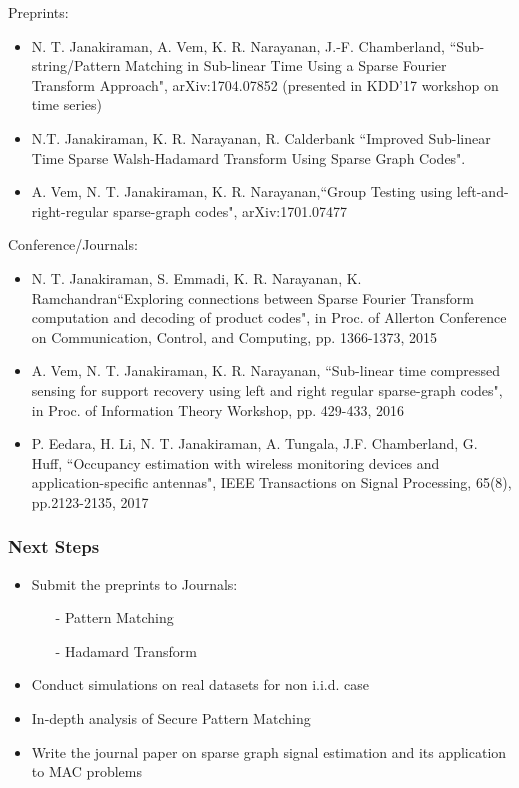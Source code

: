 \documentclass[10pt,xcolor=table]{beamer}
\begin{document}
\begin{frame}%
Preprints:
{\footnotesize 
	\begin{itemize}
		\item N. T. Janakiraman, A. Vem, K. R. Narayanan, J.-F. Chamberland, {\blue``Sub-string/Pattern Matching in Sub-linear Time Using a Sparse Fourier Transform Approach",} arXiv:1704.07852 (presented in KDD'17 workshop on time series)
		\item N.T. Janakiraman, K. R. Narayanan, R. Calderbank {\blue``Improved Sub-linear Time Sparse Walsh-Hadamard Transform Using Sparse Graph Codes"}.
		\item A. Vem, N. T. Janakiraman, K. R. Narayanan,{\blue ``Group Testing using left-and-right-regular sparse-graph codes",} arXiv:1701.07477
		
	\end{itemize}
}

Conference/Journals:
{\footnotesize 
	\begin{itemize}
		\item N. T. Janakiraman, S. Emmadi, K. R. Narayanan, K. Ramchandran{\blue ``Exploring connections between Sparse Fourier Transform computation and decoding of product codes",} in Proc. of Allerton Conference on Communication, Control, and Computing, pp. 1366-1373, 2015
		\item A. Vem, N. T. Janakiraman, K. R. Narayanan, {\blue ``Sub-linear time compressed sensing for support recovery using left and right regular sparse-graph codes",} in Proc. of Information Theory Workshop, pp. 429-433, 2016
		\item P. Eedara, H. Li, N. T. Janakiraman, A. Tungala, J.F. Chamberland, G. Huff, {\blue ``Occupancy estimation with wireless monitoring devices and application-specific antennas",} IEEE Transactions on Signal Processing, 65(8), pp.2123-2135, 2017
		
		
	\end{itemize}
}
\end{frame}


\begin{frame}\frametitle{Next Steps}
\begin{itemize}\itemsep10pt
\item Submit the preprints to Journals:
\begin{itemize}
	\item[-]  Pattern Matching
	\item[-]  Hadamard Transform
\end{itemize}
\item Conduct simulations on real datasets for non i.i.d. case
\item In-depth analysis of Secure Pattern Matching
\item Write the
journal paper on sparse graph signal estimation and its application to MAC problems
\end{itemize}
\end{frame}
\end{document}
